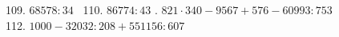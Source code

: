 109. $68578:34$ \ 110. $86774:43$ . $821 \cdot 340 - 9567 + 576 - 60993 : 753$ \\ 112. $1000 - 32032 : 208 + 551156 : 607$ \quad
